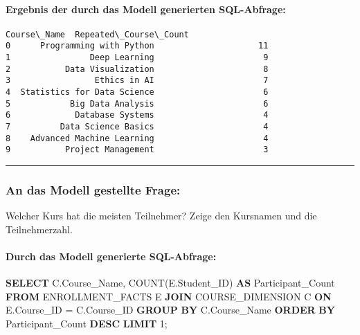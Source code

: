 \documentclass[11pt]{article}
\newenvironment{Shaded}{}{}
\newcommand{\KeywordTok}[1]{\textcolor[rgb]{0.00,0.44,0.13}{\textbf{{#1}}}}
\newcommand{\DecValTok}[1]{\textcolor[rgb]{0.25,0.63,0.44}{{#1}}}
\newcommand{\FunctionTok}[1]{\textcolor[rgb]{0.02,0.16,0.49}{{#1}}}
\newcommand{\NormalTok}[1]{{#1}}
\newcommand{\OperatorTok}[1]{\textcolor[rgb]{0.40,0.40,0.40}{{#1}}}
\begin{document}
    
    \hypertarget{ergebnis-der-durch-das-modell-generierten-sql-abfrage}{%
\paragraph{Ergebnis der durch das Modell generierten
SQL-Abfrage:}\label{ergebnis-der-durch-das-modell-generierten-sql-abfrage}}

    
    
    \begin{Verbatim}[commandchars=\\\{\}]
                   Course\_Name  Repeated\_Course\_Count
0      Programming with Python                     11
1                Deep Learning                      9
2           Data Visualization                      8
3                 Ethics in AI                      7
4  Statistics for Data Science                      6
5            Big Data Analysis                      6
6             Database Systems                      4
7          Data Science Basics                      4
8    Advanced Machine Learning                      4
9           Project Management                      3
    \end{Verbatim}

    
    \begin{center}\rule{0.5\linewidth}{0.5pt}\end{center}

    
    \hypertarget{an-das-modell-gestellte-frage}{%
\subsubsection{An das Modell gestellte
Frage:}\label{an-das-modell-gestellte-frage}}

Welcher Kurs hat die meisten Teilnehmer? Zeige den Kursnamen und die
Teilnehmerzahl.

    
    \hypertarget{durch-das-modell-generierte-sql-abfrage}{%
\paragraph{Durch das Modell generierte
SQL-Abfrage:}\label{durch-das-modell-generierte-sql-abfrage}}

\begin{Shaded}
\begin{Highlighting}[]
\KeywordTok{SELECT}\NormalTok{ C.Course\_Name, }\FunctionTok{COUNT}\NormalTok{(E.Student\_ID) }\KeywordTok{AS}\NormalTok{ Participant\_Count}
\KeywordTok{FROM}\NormalTok{ ENROLLMENT\_FACTS E}
\KeywordTok{JOIN}\NormalTok{ COURSE\_DIMENSION C }\KeywordTok{ON}\NormalTok{ E.Course\_ID }\OperatorTok{=}\NormalTok{ C.Course\_ID}
\KeywordTok{GROUP} \KeywordTok{BY}\NormalTok{ C.Course\_Name}
\KeywordTok{ORDER} \KeywordTok{BY}\NormalTok{ Participant\_Count }\KeywordTok{DESC}
\KeywordTok{LIMIT} \DecValTok{1}\NormalTok{;}
\end{Highlighting}
\end{Shaded}
\end{document}
